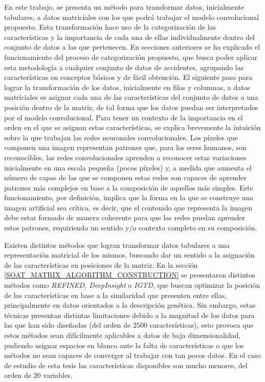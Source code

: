 En este trabajo, se presenta un método para transformar datos, inicialmente tabulares, a datos matriciales con los que podrá trabajar el modelo convolucional propuesto. Esta transformación hace uso de la categorización de las características y la importancia de cada una de ellas individualmente dentro del conjunto de datos a las que pertenecen. En secciones anteriores se ha explicado el funcionamiento del proceso de categorización propuesto, que busca poder aplicar esta metodología a cualquier conjunto de datos de accidentes, agrupando las características en conceptos básicos y de fácil obtención. El siguiente paso para lograr la transformación de los datos, inicialmente en filas y columnas, a datos matriciales es asignar cada una de las características del conjunto de datos a una posición dentro de la matriz, de tal forma que los datos puedan ser interpretados por el modelo convolucional. Para tener un contexto de la importancia en el orden en el que se asignan estas características, se explica brevemente la intuición sobre la que trabajan las redes neuronales convolucionales. Los píxeles que componen una imagen representan patrones que, para los seres humanos, son reconocibles, las redes convolucionales aprenden a reconocer estas variaciones inicialmente en una escala pequeña (pocos píxeles) y, a medida que aumenta el número de capas de las que se componen estas redes son capaces de aprender patrones más complejos en base a la composición de aquellos más simples. Este funcionamiento, por definición, implica que la forma en la que se construye una imagen artificial sea crítica, es decir, que el contenido que representa la imagen debe estar formado de manera coherente para que las redes puedan aprender estos patrones, requiriendo un sentido y/o contexto completo en su composición.

Existen distintos métodos que logran transformar datos tabulares a una representación matricial de los mismos, buscando dar un sentido a la asignación de las características en posiciones de la matriz. En la sección \ref{SOAT_MATRIX_ALGORITHM_CONSTRUCTION} se presentaron distintos métodos como \textit{REFINED, DeepInsight} o \textit{IGTD}, que buscan optimizar la posición de las características en base a la similaridad que presenten entre ellas, principalmente en datos orientados a la descripción genética. Sin embargo, estas técnicas presentan distintas limitaciones debido a la magnitud de los datos para las que han sido diseñadas (del orden de $2500$ características), esto provoca que estos métodos sean difícilmente aplicables a datos de baja dimensionalidad, pudiendo asignar espacios en blanco ante la falta de características o que los métodos no sean capaces de converger al trabajar con tan pocos datos. En el caso de estudio de esta tesis las características disponibles son mucho menores, del orden de $20$ variables.

